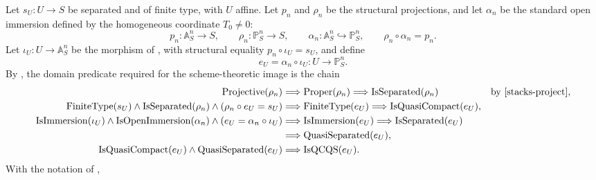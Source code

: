 \begin{definition}
  \label{def:nagata-affine-compactification}
  \lean{}

  Let $s_U\colon U\to S$ be separated and of finite type, with $U$ affine.
  Let $p_n$ and $\rho_n$ be the structural projections, and let $\alpha_n$ be
  the standard open immersion defined by the homogeneous coordinate
  $T_0\neq0$:
  \[
    p_n\colon\mathbb A^n_S\to S,
    \qquad
    \rho_n\colon\mathbb P^n_S\to S,
    \qquad
    \alpha_n\colon\mathbb A^n_S\hookrightarrow\mathbb P^n_S,
    \qquad
    \rho_n\circ\alpha_n=p_n.
  \]
  Let $\iota_U\colon U\to\mathbb A^n_S$ be the morphism of
  , with structural
  equality $p_n\circ\iota_U=s_U$, and define
  \[
    e_U=\alpha_n\circ\iota_U\colon U\to\mathbb P^n_S.              \tag{51}
  \]
  By ,
  the domain predicate
  required for the scheme-theoretic image is the chain
  \[
  \begin{aligned}
    \operatorname{Projective}(\rho_n)
      &\Longrightarrow\operatorname{Proper}(\rho_n)
       \Longrightarrow\operatorname{IsSeparated}(\rho_n)
       &&\text{by \cite[Tag 01WC]{stacks-project}},\\
    \operatorname{FiniteType}(s_U)\wedge
      \operatorname{IsSeparated}(\rho_n)\wedge
      (\rho_n\circ e_U=s_U)
      &\Longrightarrow\operatorname{FiniteType}(e_U)
       \Longrightarrow\operatorname{IsQuasiCompact}(e_U),\\
    \operatorname{IsImmersion}(\iota_U)\wedge
      \operatorname{IsOpenImmersion}(\alpha_n)\wedge
      (e_U=\alpha_n\circ\iota_U)
      &\Longrightarrow\operatorname{IsImmersion}(e_U)
       \Longrightarrow\operatorname{IsSeparated}(e_U)\\
      &\Longrightarrow\operatorname{QuasiSeparated}(e_U),\\
    \operatorname{IsQuasiCompact}(e_U)\wedge
      \operatorname{QuasiSeparated}(e_U)
      &\Longrightarrow\operatorname{IsQCQS}(e_U).
  \end{aligned}
  \]
  With the notation of
  ,

\end{definition}
